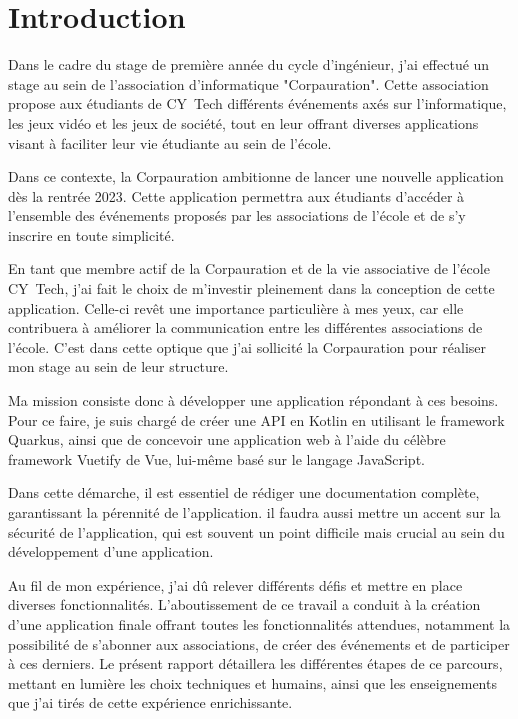 
\section{Introduction}

Dans le cadre du stage de première année du cycle d'ingénieur, j'ai effectué un stage au sein de l'association d'informatique "Corpauration". Cette association propose aux étudiants de CY~Tech différents événements axés sur l'informatique, les jeux vidéo et les jeux de société, tout en leur offrant diverses applications visant à faciliter leur vie étudiante au sein de l'école.

Dans ce contexte, la Corpauration ambitionne de lancer une nouvelle application dès la rentrée 2023. Cette application permettra aux étudiants d'accéder à l'ensemble des événements proposés par les associations de l'école et de s'y inscrire en toute simplicité.

En tant que membre actif de la Corpauration et de la vie associative de l'école CY~Tech, j'ai fait le choix de m'investir pleinement dans la conception de cette application. Celle-ci revêt une importance particulière à mes yeux, car elle contribuera à améliorer la communication entre les différentes associations de l'école. C'est dans cette optique que j'ai sollicité la Corpauration pour réaliser mon stage au sein de leur structure.

\medskip

Ma mission consiste donc à développer une application répondant à ces besoins. Pour ce faire, je suis chargé de créer une API en Kotlin en utilisant le framework Quarkus, ainsi que de concevoir une application web à l'aide du célèbre framework Vuetify de Vue, lui-même basé sur le langage JavaScript.

Dans cette démarche, il est essentiel de rédiger une documentation complète, garantissant la pérennité de l'application. il faudra aussi mettre un accent sur la sécurité de l'application, qui est souvent un point difficile mais crucial au sein du développement d'une application.

\medskip

Au fil de mon expérience, j'ai dû relever différents défis et mettre en place diverses fonctionnalités. L'aboutissement de ce travail a conduit à la création d'une application finale offrant toutes les fonctionnalités attendues, notamment la possibilité de s'abonner aux associations, de créer des événements et de participer à ces derniers. Le présent rapport détaillera les différentes étapes de ce parcours, mettant en lumière les choix techniques et humains, ainsi que les enseignements que j'ai tirés de cette expérience enrichissante.

